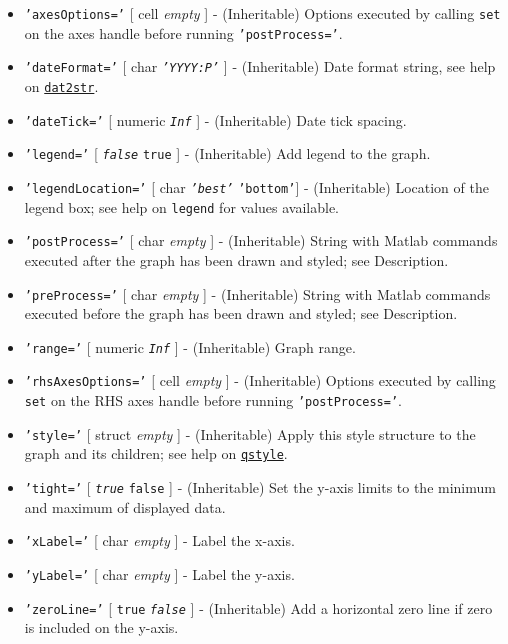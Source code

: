  \begin{itemize}
 \item
   \texttt{'axesOptions='} {[} cell \textbar{} \emph{empty} {]} -
   (Inheritable) Options executed by calling \texttt{set} on the axes
   handle before running \texttt{'postProcess='}.
 \item
   \texttt{'dateFormat='} {[} char \textbar{} \emph{\texttt{'YYYY:P'}}
   {]} - (Inheritable) Date format string, see help on
   \href{dates/dat2str}{\texttt{dat2str}}.
 \item
   \texttt{'dateTick='} {[} numeric \textbar{} \emph{\texttt{Inf}} {]} -
   (Inheritable) Date tick spacing.
 \item
   \texttt{'legend='} {[} \emph{\texttt{false}} \textbar{} \texttt{true}
   {]} - (Inheritable) Add legend to the graph.
 \item
   \texttt{'legendLocation='} {[} char \textbar{} \emph{\texttt{'best'}}
   \textbar{} \texttt{'bottom'}{]} - (Inheritable) Location of the legend
   box; see help on \texttt{legend} for values available.
 \item
   \texttt{'postProcess='} {[} char \textbar{} \emph{empty} {]} -
   (Inheritable) String with Matlab commands executed after the graph has
   been drawn and styled; see Description.
 \item
   \texttt{'preProcess='} {[} char \textbar{} \emph{empty} {]} -
   (Inheritable) String with Matlab commands executed before the graph
   has been drawn and styled; see Description.
 \item
   \texttt{'range='} {[} numeric \textbar{} \emph{\texttt{Inf}} {]} -
   (Inheritable) Graph range.
 \item
   \texttt{'rhsAxesOptions='} {[} cell \textbar{} \emph{empty} {]} -
   (Inheritable) Options executed by calling \texttt{set} on the RHS axes
   handle before running \texttt{'postProcess='}.
 \item
   \texttt{'style='} {[} struct \textbar{} \emph{empty} {]} -
   (Inheritable) Apply this style structure to the graph and its
   children; see help on \href{qreport/qstyle}{\texttt{qstyle}}.
 \item
   \texttt{'tight='} {[} \emph{\texttt{true}} \textbar{} \texttt{false}
   {]} - (Inheritable) Set the y-axis limits to the minimum and maximum
   of displayed data.
 \item
   \texttt{'xLabel='} {[} char \textbar{} \emph{empty} {]} - Label the
   x-axis.
 \item
   \texttt{'yLabel='} {[} char \textbar{} \emph{empty} {]} - Label the
   y-axis.
 \item
   \texttt{'zeroLine='} {[} \texttt{true} \textbar{}
   \emph{\texttt{false}} {]} - (Inheritable) Add a horizontal zero line
   if zero is included on the y-axis.
 \end{itemize}
 
